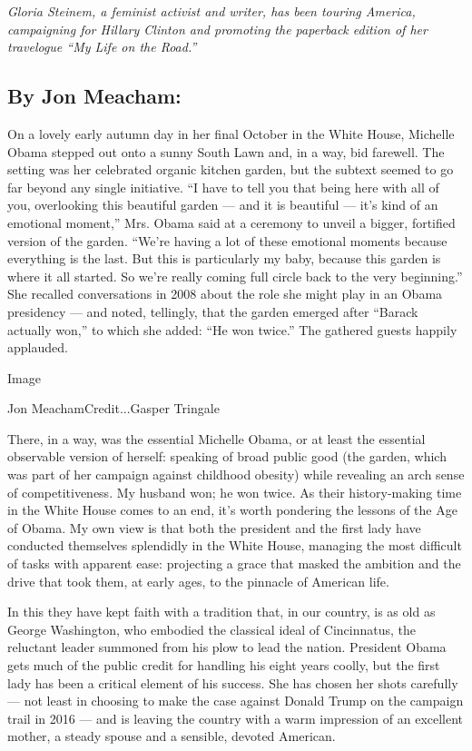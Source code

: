 \emph{Gloria Steinem, a feminist activist and writer, has been touring
America, campaigning for Hillary Clinton and promoting the paperback
edition of her travelogue ``My Life on the Road.''}

\hypertarget{by-jon-meacham}{%
\subsection{By Jon Meacham:}\label{by-jon-meacham}}

On a lovely early autumn day in her final October in the White House,
Michelle Obama stepped out onto a sunny South Lawn and, in a way, bid
farewell. The setting was her celebrated organic kitchen garden, but the
subtext seemed to go far beyond any single initiative. ``I have to tell
you that being here with all of you, overlooking this beautiful garden
--- and it is beautiful --- it's kind of an emotional moment,'' Mrs.
Obama said at a ceremony to unveil a bigger, fortified version of the
garden. ``We're having a lot of these emotional moments because
everything is the last. But this is particularly my baby, because this
garden is where it all started. So we're really coming full circle back
to the very beginning.'' She recalled conversations in 2008 about the
role she might play in an Obama presidency --- and noted, tellingly,
that the garden emerged after ``Barack actually won,'' to which she
added: ``He won twice.'' The gathered guests happily applauded.

Image

Jon MeachamCredit...Gasper Tringale

There, in a way, was the essential Michelle Obama, or at least the
essential observable version of herself: speaking of broad public good
(the garden, which was part of her campaign against childhood obesity)
while revealing an arch sense of competitiveness. My husband won; he won
twice. As their history-making time in the White House comes to an end,
it's worth pondering the lessons of the Age of Obama. My own view is
that both the president and the first lady have conducted themselves
splendidly in the White House, managing the most difficult of tasks with
apparent ease: projecting a grace that masked the ambition and the drive
that took them, at early ages, to the pinnacle of American life.

In this they have kept faith with a tradition that, in our country, is
as old as George Washington, who embodied the classical ideal of
Cincinnatus, the reluctant leader summoned from his plow to lead the
nation. President Obama gets much of the public credit for handling his
eight years coolly, but the first lady has been a critical element of
his success. She has chosen her shots carefully --- not least in
choosing to make the case against Donald Trump on the campaign trail in
2016 --- and is leaving the country with a warm impression of an
excellent mother, a steady spouse and a sensible, devoted American.

